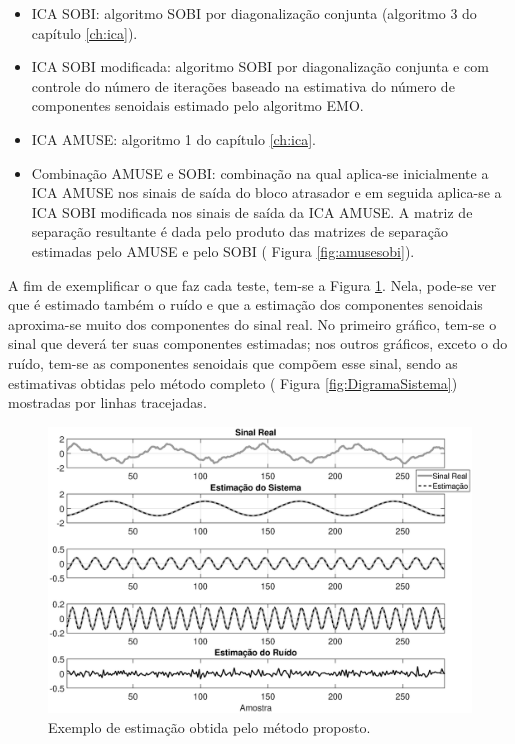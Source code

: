 \documentclass[a4paper,12pt]{monografia}
\theoremstyle{plain}
\theoremstyle{definition}
\theoremstyle{remark}
\begin{document}
\begin{itemize}
    \item ICA SOBI: algoritmo SOBI por diagonalização conjunta (algoritmo 3 do capítulo \ref{ch:ica}).
    \item ICA SOBI modificada: algoritmo SOBI por diagonalização conjunta e com controle do número de iterações baseado na estimativa do número de componentes senoidais estimado pelo algoritmo EMO.
    \item ICA AMUSE: algoritmo 1 do capítulo \ref{ch:ica}.
    \item Combinação AMUSE e SOBI: combinação na qual aplica-se inicialmente a ICA AMUSE nos sinais de saída do bloco atrasador e em seguida aplica-se a ICA SOBI modificada nos sinais de saída da ICA AMUSE. A matriz de separação resultante é dada pelo produto das matrizes de separação estimadas pelo AMUSE e pelo SOBI ( Figura \ref{fig:amusesobi}).  
\end{itemize}

A fim de exemplificar o que faz cada teste, tem-se a Figura \ref{fig:exemplo}. Nela, pode-se ver que é estimado também o ruído e que a estimação dos componentes senoidais aproxima-se muito dos componentes do sinal real. No primeiro gráfico, tem-se o sinal que deverá ter suas componentes estimadas; nos outros gráficos, exceto o do ruído, tem-se as componentes senoidais que compõem esse sinal, sendo as estimativas obtidas pelo método completo ( Figura \ref{fig:DigramaSistema}) mostradas por linhas tracejadas.

\begin{figure}[!htb]
    \begin{center}
    \advance\leftskip-2.5cm
    \includegraphics[scale=0.50]{imagens/Exemplov2.eps}
    \caption{Exemplo de estimação obtida pelo método proposto.}
    \label{fig:exemplo}
    \end{center}
\end{figure}
\end{document}
